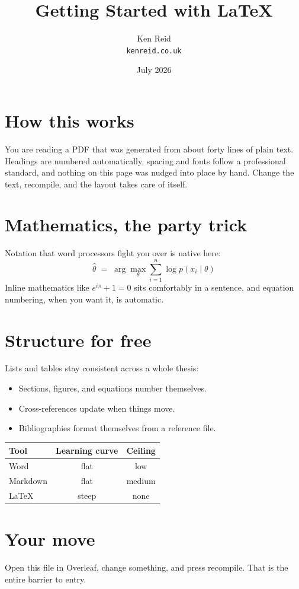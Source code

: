 \documentclass[11pt]{article}
\title{Getting Started with \LaTeX}
\author{Ken Reid \\ \texttt{kenreid.co.uk}}
\date{July 2026}
\begin{document}
\maketitle

\section{How this works}
You are reading a PDF that was generated from about forty lines of
plain text. Headings are numbered automatically, spacing and fonts
follow a professional standard, and nothing on this page was nudged
into place by hand. Change the text, recompile, and the layout takes
care of itself.

\section{Mathematics, the party trick}
Notation that word processors fight you over is native here:
\[
  \hat{\theta} \;=\; \arg\max_{\theta} \sum_{i=1}^{n} \log p(x_i \mid \theta)
\]
Inline mathematics like $e^{i\pi} + 1 = 0$ sits comfortably in a
sentence, and equation numbering, when you want it, is automatic.

\section{Structure for free}
Lists and tables stay consistent across a whole thesis:
\begin{itemize}
  \item Sections, figures, and equations number themselves.
  \item Cross-references update when things move.
  \item Bibliographies format themselves from a reference file.
\end{itemize}

\begin{center}
\begin{tabular}{lcc}
  \toprule
  Tool     & Learning curve & Ceiling \\
  \midrule
  Word     & flat           & low     \\
  Markdown & flat           & medium  \\
  \LaTeX{} & steep          & none    \\
  \bottomrule
\end{tabular}
\end{center}

\section{Your move}
Open this file in Overleaf, change something, and press recompile.
That is the entire barrier to entry.
\end{document}
